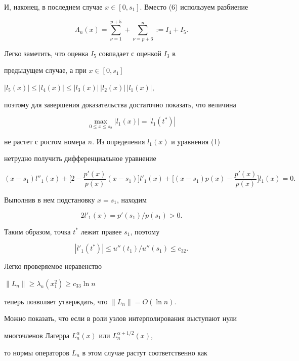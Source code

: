 И, наконец, в последнем случае $x\in[0,s_1]$. Вместо (6) используем разбиение


$$


\Lambda_n(x)= \sum_{\nu=1}^{p+5}+


\sum_{\nu=p+6}^{n}:=I_4+I_5.


$$


Легко заметить, что оценка $I_5$ совпадает с оценкой $I_3$ в


предыдущем случае, а при $x\in[0,s_1]$


$|l_5(x)|\leq|l_4(x)|\leq|l_3(x)|\,|l_2(x)|\,|l_1(x)|$,


поэтому для завершения доказательства достаточно показать, что величина


$$


\max_{0\leq x\leq s_2}| l_1(x)|=| l_1(t^\ast)|


$$


не растет с ростом номера $n$. Из определения $l_1(x)$ и уравнения (1)


нетрудно получить дифференциальное уравнение


$$


(x-s_1)l''_1(x)+\bigg[2-\frac{p'(x)}{p(x)}(x-s_1)


\bigg]l'_1(x)+


\bigg[(x-s_1)p(x)-\frac{p'(x)}{p(x)}\bigg]l_1(x)=0.


$$


Выполнив в нем подстановку $x=s_1$, находим


$$


2l'_1(x)=p'(s_1)/p(s_1)>0.


$$


Таким образом, точка $t^\ast$ лежит правее $s_1$, поэтому


$$


|l'_1(t^\ast)|\leq u''(t_1)/


u''(s_1)\leq c_{32}.


$$


Легко проверяемое неравенство 


$\|L_n\|\geq\lambda_n(x_1^2)\geq c_{33}\ln n$


теперь позволяет утверждать, что $\| L_n\|=O(\ln n)$. 





Можно показать, что если в роли узлов интерполирования выступают нули


многочленов Лагерра $L^\alpha_n(x)$ или $L^{\alpha+1/2}_n(x)$, 


то нормы операторов $L_n$ в этом случае растут соответственно как


